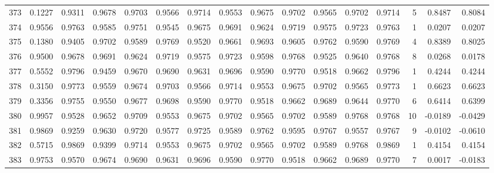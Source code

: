 \begin{tabular}{lrrrrrrrrrrrrrrr}
373 &      0.1227 &  0.9311 &  0.9678 &  0.9703 &  0.9566 &  0.9714 &  0.9553 &  0.9675 &  0.9702 &  0.9565 &   0.9702 &     0.9714 &      5 &                    0.8487 &                     0.8084 \\
374 &      0.9556 &  0.9763 &  0.9585 &  0.9751 &  0.9545 &  0.9675 &  0.9691 &  0.9624 &  0.9719 &  0.9575 &   0.9723 &     0.9763 &      1 &                    0.0207 &                     0.0207 \\
375 &      0.1380 &  0.9405 &  0.9702 &  0.9589 &  0.9769 &  0.9520 &  0.9661 &  0.9693 &  0.9605 &  0.9762 &   0.9590 &     0.9769 &      4 &                    0.8389 &                     0.8025 \\
376 &      0.9500 &  0.9678 &  0.9691 &  0.9624 &  0.9719 &  0.9575 &  0.9723 &  0.9598 &  0.9768 &  0.9525 &   0.9640 &     0.9768 &      8 &                    0.0268 &                     0.0178 \\
377 &      0.5552 &  0.9796 &  0.9459 &  0.9670 &  0.9690 &  0.9631 &  0.9696 &  0.9590 &  0.9770 &  0.9518 &   0.9662 &     0.9796 &      1 &                    0.4244 &                     0.4244 \\
378 &      0.3150 &  0.9773 &  0.9559 &  0.9674 &  0.9703 &  0.9566 &  0.9714 &  0.9553 &  0.9675 &  0.9702 &   0.9565 &     0.9773 &      1 &                    0.6623 &                     0.6623 \\
379 &      0.3356 &  0.9755 &  0.9550 &  0.9677 &  0.9698 &  0.9590 &  0.9770 &  0.9518 &  0.9662 &  0.9689 &   0.9644 &     0.9770 &      6 &                    0.6414 &                     0.6399 \\
380 &      0.9957 &  0.9528 &  0.9652 &  0.9709 &  0.9553 &  0.9675 &  0.9702 &  0.9565 &  0.9702 &  0.9589 &   0.9768 &     0.9768 &     10 &                   -0.0189 &                    -0.0429 \\
381 &      0.9869 &  0.9259 &  0.9630 &  0.9720 &  0.9577 &  0.9725 &  0.9589 &  0.9762 &  0.9595 &  0.9767 &   0.9557 &     0.9767 &      9 &                   -0.0102 &                    -0.0610 \\
382 &      0.5715 &  0.9869 &  0.9399 &  0.9714 &  0.9553 &  0.9675 &  0.9702 &  0.9565 &  0.9702 &  0.9589 &   0.9768 &     0.9869 &      1 &                    0.4154 &                     0.4154 \\
383 &      0.9753 &  0.9570 &  0.9674 &  0.9690 &  0.9631 &  0.9696 &  0.9590 &  0.9770 &  0.9518 &  0.9662 &   0.9689 &     0.9770 &      7 &                    0.0017 &                    -0.0183 \\

\end{tabular}
